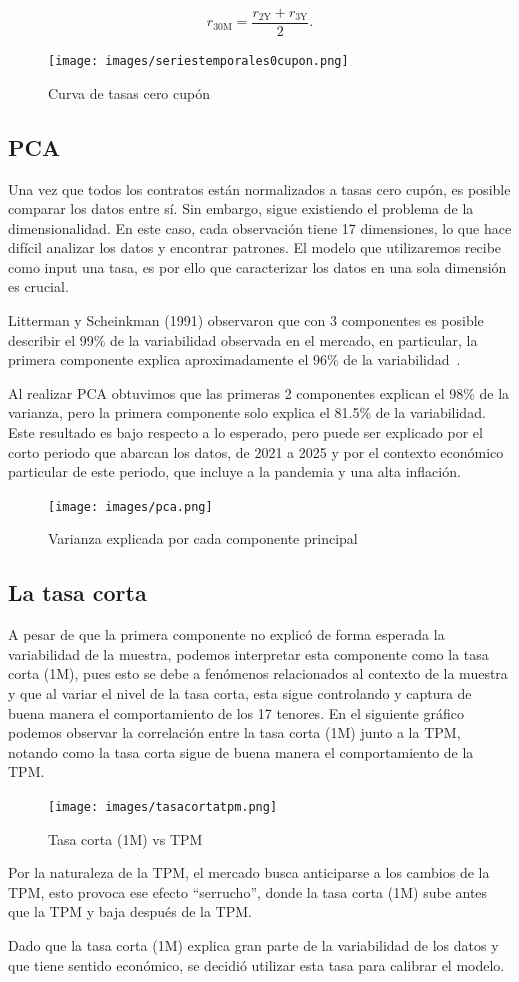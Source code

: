 $$r_{30 \text{M}} = \dfrac{r_{2 \text{Y}} + r_{3 \text{Y}}}{2}.$$

\begin{figure}[H]
    \centering
        \texttt{[image: images/seriestemporales0cupon.png]}
    \caption{Curva de tasas cero cupón
    }\label{fig:0cupon}
\end{figure}
\subsection{PCA}
\qquad Una vez que todos los contratos están normalizados a tasas cero cupón, 
es posible 
comparar los datos entre sí. Sin embargo, sigue existiendo el problema de la 
dimensionalidad. En este caso, cada observación tiene 17 dimensiones, lo que 
hace difícil 
analizar los datos y encontrar patrones. El modelo que utilizaremos recibe 
como input una 
tasa, es por ello que caracterizar los datos en una sola dimensión es 
crucial. 

Litterman y Scheinkman (1991) observaron que con 3 componentes es posible describir el 99\% de la variabilidad observada en el mercado, en particular, la primera componente explica aproximadamente el 96\% de la variabilidad \cite{pca}.

Al realizar PCA obtuvimos que las primeras 2 componentes explican el 98\% de la varianza, pero la primera componente solo explica el 81.5\% de la variabilidad. Este resultado es bajo respecto a lo esperado, pero puede ser explicado por el corto periodo que abarcan los datos, de 2021 a 2025 y por el contexto económico particular de este periodo, que incluye a la pandemia y una alta inflación. 
\begin{figure}[H]
    \centering
        \texttt{[image: images/pca.png]}
    \caption{Varianza explicada por cada componente principal
    }\label{fig:varpca}
\end{figure}
\subsection{La tasa corta}
\qquad A pesar de que la primera componente no explicó de forma esperada la variabilidad de la muestra, podemos interpretar esta componente como la tasa corta (1M), pues esto se debe a fenómenos relacionados al contexto de la muestra y que al variar el nivel de la tasa corta, esta sigue controlando y captura de buena manera el comportamiento de los 17 tenores. En el siguiente gráfico podemos observar la correlación entre la tasa corta (1M) junto a la TPM, notando como la tasa corta sigue de buena manera el comportamiento de la TPM.
\begin{figure}[H]
    \centering
        \texttt{[image: images/tasacortatpm.png]}
    \caption{Tasa corta (1M) vs TPM
    }\label{fig:varpca}
\end{figure}
Por la naturaleza de la TPM, el mercado busca anticiparse a los cambios de la TPM, esto provoca ese efecto “serrucho”, donde la tasa corta (1M) sube antes que la TPM y baja después de la TPM. 

Dado que la tasa corta (1M) explica gran parte de la variabilidad 
de los datos y que tiene sentido económico, se decidió utilizar 
esta tasa para calibrar el modelo.